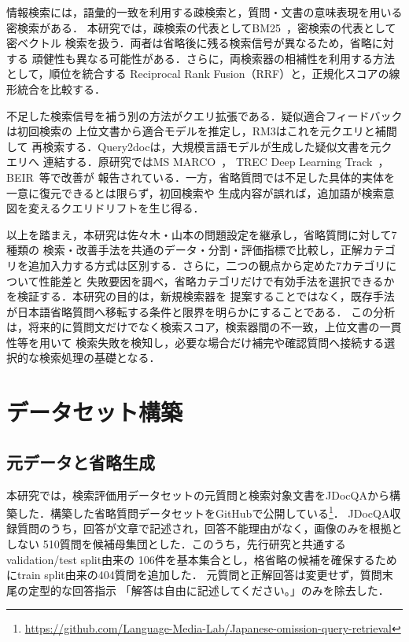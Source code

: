 \documentclass[twocolumn,a4paper,10pt]{ltjsarticle}
\begin{document}
情報検索には，語彙的一致を利用する疎検索と，質問・文書の意味表現を用いる密検索がある．
本研究では，疎検索の代表としてBM25~\cite{robertson2009bm25}，密検索の代表として密ベクトル
検索\cite{karpukhin2020dpr}を扱う．両者は省略後に残る検索信号が異なるため，省略に対する
頑健性も異なる可能性がある．さらに，両検索器の相補性を利用する方法として，順位を統合する
Reciprocal Rank Fusion（RRF）\cite{cormack2009rrf}と，正規化スコアの線形統合を比較する．

不足した検索信号を補う別の方法がクエリ拡張である．疑似適合フィードバックは初回検索の
上位文書から適合モデル\cite{lavrenko2001relevance}を推定し，RM3はこれを元クエリと補間して
再検索する\cite{jaleel2004rm3}．Query2docは，大規模言語モデルが生成した疑似文書を元クエリへ
連結する\cite{wang2023query2doc}．原研究ではMS MARCO~\cite{nguyen2016msmarco}，
TREC Deep Learning Track~\cite{craswell2020trec}，BEIR~\cite{thakur2021beir}等で改善が
報告されている．一方，省略質問では不足した具体的実体を一意に復元できるとは限らず，初回検索や
生成内容が誤れば，追加語が検索意図を変えるクエリドリフトを生じ得る．

以上を踏まえ，本研究は佐々木・山本の問題設定を継承し，省略質問に対して7種類の
検索・改善手法を共通のデータ・分割・評価指標で比較し，正解カテゴリを追加入力する方式は区別する．さらに，二つの観点から定めた7カテゴリについて性能差と
失敗要因を調べ，省略カテゴリだけで有効手法を選択できるかを検証する．本研究の目的は，新規検索器を
提案することではなく，既存手法が日本語省略質問へ移転する条件と限界を明らかにすることである．
この分析は，将来的に質問文だけでなく検索スコア，検索器間の不一致，上位文書の一貫性等を用いて
検索失敗を検知し，必要な場合だけ補完や確認質問へ接続する選択的な検索処理の基礎となる．

\section{データセット構築}

\subsection{元データと省略生成}

本研究では，検索評価用データセットの元質問と検索対象文書をJDocQAから構築した．構築した省略質問データセットをGitHubで公開している\footnote{\url{https://github.com/Language-Media-Lab/Japanese-omission-query-retrieval}}．
JDocQA収録質問のうち，回答が文章で記述され，回答不能理由がなく，画像のみを根拠としない
510質問を候補母集団とした．このうち，先行研究と共通するvalidation/test split由来の
106件を基本集合とし，格省略の候補を確保するためにtrain split由来の404質問を追加した．
元質問と正解回答は変更せず，質問末尾の定型的な回答指示
「解答は自由に記述してください。」のみを除去した．
\end{document}
